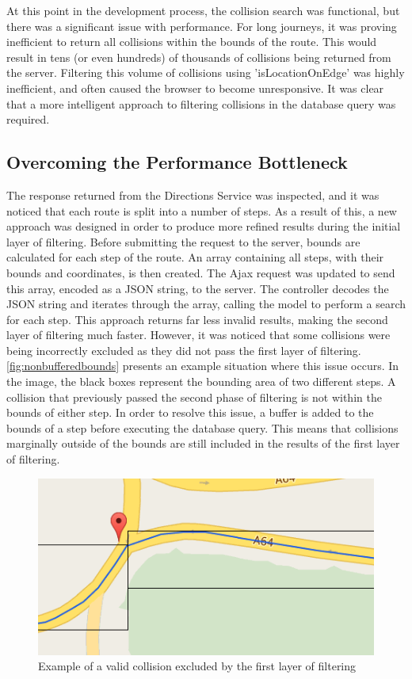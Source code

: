 \documentclass[authoryearcitations]{UoYCSproject}
\begin{document}
At this point in the development process, the collision search was functional, but there was a significant issue with performance. For long journeys, it was proving inefficient to return all collisions within the bounds of the route. This would result in tens (or even hundreds) of thousands of collisions being returned from the server. Filtering this volume of collisions using 'isLocationOnEdge' was highly inefficient, and often caused the browser to become unresponsive. It was clear that a more intelligent approach to filtering collisions in the database query was required.

\subsection{Overcoming the Performance Bottleneck}

The response returned from the Directions Service was inspected, and it was noticed that each route is split into a number of steps. As a result of this, a new approach was designed in order to produce more refined results during the initial layer of filtering. Before submitting the request to the server, bounds are calculated for each step of the route. An array containing all steps, with their bounds and coordinates, is then created. The Ajax request was updated to send this array, encoded as a JSON string, to the server. The controller decodes the JSON string and iterates through the array, calling the model to perform a search for each step. This approach returns far less invalid results, making the second layer of filtering much faster. However, it was noticed that some collisions were being incorrectly excluded as they did not pass the first layer of filtering. \autoref{fig:nonbufferedbounds} presents an example situation where this issue occurs. In the image, the black boxes represent the bounding area of two different steps. A collision that previously passed the second phase of filtering is not within the bounds of either step. In order to resolve this issue, a buffer is added to the bounds of a step before executing the database query. This means that collisions marginally outside of the bounds are still included in the results of the first layer of filtering.

\begin{figure}
	\center
	\includegraphics[scale=0.7]{nonbufferedbounds}
	\caption{Example of a valid collision excluded by the first layer of filtering}
	\label{fig:nonbufferedbounds}
\end{figure}
\end{document}
